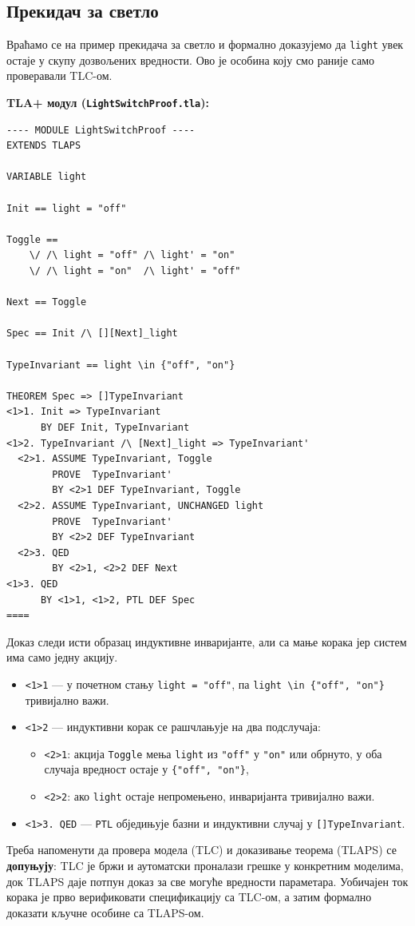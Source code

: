 \subsection{Прекидач за светло}
\begin{primer}
Враћамо се на пример прекидача за светло и формално доказујемо да \texttt{light} увек остаје
у скупу дозвољених вредности. Ово је особина коју смо раније само проверавали TLC-ом.

\textbf{TLA+ модул (\texttt{LightSwitchProof.tla}):}
\begin{lstlisting}
---- MODULE LightSwitchProof ----
EXTENDS TLAPS

VARIABLE light

Init == light = "off"

Toggle ==
    \/ /\ light = "off" /\ light' = "on"
    \/ /\ light = "on"  /\ light' = "off"

Next == Toggle

Spec == Init /\ [][Next]_light

TypeInvariant == light \in {"off", "on"}

THEOREM Spec => []TypeInvariant
<1>1. Init => TypeInvariant
      BY DEF Init, TypeInvariant
<1>2. TypeInvariant /\ [Next]_light => TypeInvariant'
  <2>1. ASSUME TypeInvariant, Toggle
        PROVE  TypeInvariant'
        BY <2>1 DEF TypeInvariant, Toggle
  <2>2. ASSUME TypeInvariant, UNCHANGED light
        PROVE  TypeInvariant'
        BY <2>2 DEF TypeInvariant
  <2>3. QED
        BY <2>1, <2>2 DEF Next
<1>3. QED
      BY <1>1, <1>2, PTL DEF Spec
====
\end{lstlisting}

Доказ следи исти образац индуктивне инваријанте, али са мање корака јер систем има само једну акцију.

\begin{itemize}
    \item \texttt{<1>1} --- у почетном стању \texttt{light = "off"}, па \texttt{light \textbackslash in \{"off", "on"\}} тривијално важи.
    \item \texttt{<1>2} --- индуктивни корак се рашчлањује на два подслучаја:
    \begin{itemize}
        \item \texttt{<2>1}: акција \texttt{Toggle} мења \texttt{light} из \texttt{"off"} у \texttt{"on"} или обрнуто, у оба случаја вредност остаје у \texttt{\{"off", "on"\}},
        \item \texttt{<2>2}: ако \texttt{light} остаје непромењено, инваријанта тривијално важи.
    \end{itemize}
    \item \texttt{<1>3. QED} --- \texttt{PTL} обједињује базни и индуктивни случај у \texttt{[]TypeInvariant}.
\end{itemize}
\end{primer}


Треба напоменути да провера модела (TLC) и доказивање теорема (TLAPS) се \textbf{допуњују}: TLC је бржи и аутоматски
проналази грешке у конкретним моделима, док TLAPS даје потпун доказ за све могуће вредности параметара.
Уобичајен ток корака је прво верификовати спецификацију са TLC-ом, а затим формално доказати кључне особине са TLAPS-ом.

